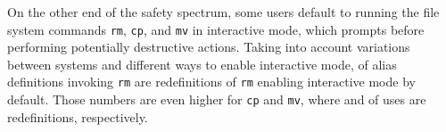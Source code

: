 
On the other end of the safety spectrum, some users default to running the file system commands \texttt{rm}, \texttt{cp}, and \texttt{mv} in interactive mode, which prompts before performing potentially destructive actions.
Taking into account variations between systems and different ways to enable interactive mode,  of alias definitions invoking \texttt{rm} are redefinitions of \texttt{rm} enabling interactive mode by default.
Those numbers are even higher for \texttt{cp} and \texttt{mv}, where  and  of uses are redefinitions, respectively. %

